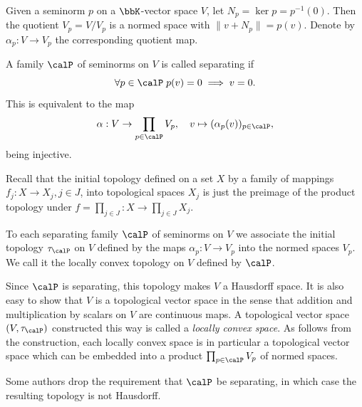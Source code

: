 \begin{defn}
    Given a seminorm $p$ on a $\bbK$-vector space $V$, let $N_p=\ker p=p^{-1}(0)$. Then the quotient $V_p=V\slash V_p$ is a normed space with $\lVert v+N_p\rVert=p(v)$. Denote by $\alpha_p:V\to V_p$ the corresponding quotient map.

    A family $\calP$ of seminorms on $V$ is called separating if 
    \[\forall p\in \calP \; p(v)=0 \implies v=0.\]
    This is equivalent to the map
    \[\alpha:V\to \prod_{p\in\calP}V_p,\quad v\mapsto (\alpha_p(v))_{p\in \calP},\]
    being injective.
\end{defn}

\begin{defn}
    Recall that the initial topology defined on a set $X$ by a family of mappings $f_j:X\to X_j, j\in J$, into topological spaces $X_j$ is just the preimage of the product topology under $f=\prod_{j\in J}:X\to \prod_{j\in J}X_j$.

    To each separating family $\calP$ of seminorms on $V$ we associate the initial topology $\tau_{\calP}$ on $V$ defined by the maps $\alpha_p:V\to V_p$ into the normed spaces $V_p$. We call it the locally convex topology on $V$ defined by $\calP$.

    Since $\calP$ is separating, this topology makes $V$ a Hausdorff space. It is also easy to show that $V$ is a topological vector space in the sense that addition and multiplication by scalars on $V$ are continuous maps. A topological vector space $(V,\tau_\calP)$ constructed this way is called a \emph{locally convex space}. As follows from the construction, each locally convex space is in particular a topological vector space which can be embedded into a product $\prod_{p\in \calP}V_p$ of normed spaces.
\end{defn}

\begin{defn}
    Some authors drop the requirement that $\calP$ be separating, in which case the resulting topology is not Hausdorff.
\end{defn}

